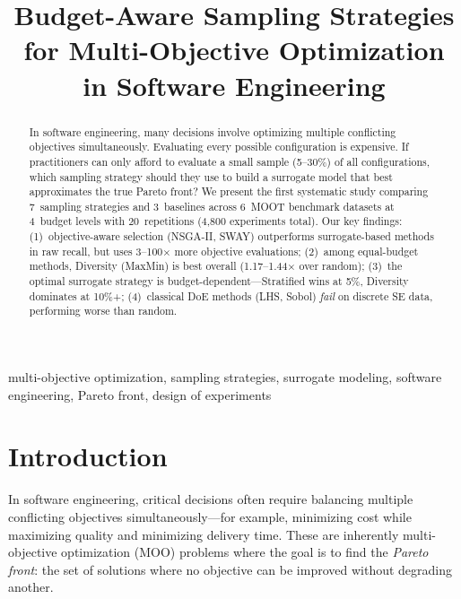 \documentclass[conference]{IEEEtran}
\begin{document}
\title{Budget-Aware Sampling Strategies for Multi-Objective Optimization in Software Engineering}

\author{
}

\maketitle

\begin{abstract}
In software engineering, many decisions involve optimizing multiple conflicting objectives simultaneously. Evaluating every possible configuration is expensive. If practitioners can only afford to evaluate a small sample (5--30\%) of all configurations, which sampling strategy should they use to build a surrogate model that best approximates the true Pareto front? We present the first systematic study comparing 7~sampling strategies and 3~baselines across 6~MOOT benchmark datasets at 4~budget levels with 20~repetitions (4,800 experiments total). Our key findings: (1)~objective-aware selection (NSGA-II, SWAY) outperforms surrogate-based methods in raw recall, but uses 3--100$\times$ more objective evaluations; (2)~among equal-budget methods, Diversity (MaxMin) is best overall (1.17--1.44$\times$ over random); (3)~the optimal surrogate strategy is budget-dependent---Stratified wins at 5\%, Diversity dominates at 10\%+; (4)~classical DoE methods (LHS, Sobol) \emph{fail} on discrete SE data, performing worse than random.
\end{abstract}

\begin{IEEEkeywords}
multi-objective optimization, sampling strategies, surrogate modeling, software engineering, Pareto front, design of experiments
\end{IEEEkeywords}

\section{Introduction}
\label{sec:intro}

In software engineering, critical decisions often require balancing multiple conflicting objectives simultaneously---for example, minimizing cost while maximizing quality and minimizing delivery time. These are inherently multi-objective optimization (MOO) problems where the goal is to find the \emph{Pareto front}: the set of solutions where no objective can be improved without degrading another.
\end{document}
